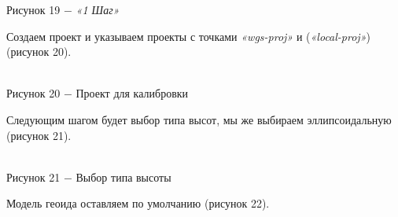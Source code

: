 \documentclass[a4paper]{article}
\begin{document}
{\begin{center}
    Рисунок 19 $-$ \textit{«1 Шаг»}  
\end{center}
\par Создаем проект и указываем проекты с точками \textit{«wgs-proj»} и  (\textit{«local-proj»}) (рисунок 20).
\begin{center}
    \\
    Рисунок 20 $-$ Проект для калибровки  
\end{center}
\par Следующим шагом будет выбор типа высот, мы же выбираем эллипсоидальную (рисунок 21).
\begin{center}
    \\
    Рисунок 21 $-$ Выбор типа высоты  
\end{center}
\par Модель геоида оставляем по умолчанию (рисунок 22).
\begin{center}
     \\

\end{center}}
\end{document}
